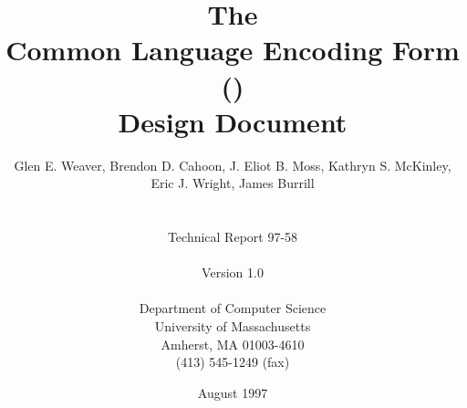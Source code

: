\begin{singlespace}
\title{\bfseries {\Large The} \\
{\Huge Common Language Encoding Form} \\
{\Huge (\clef)}\\
{\Huge Design Document}}

\author{Glen E. Weaver, Brendon D. Cahoon, J. Eliot B. Moss, Kathryn
S. McKinley, \\ Eric J. Wright, James Burrill\\
  {\ }\\ 
  {\ }\\ 
  {\large Technical Report 97-58 }\\ 
  {\ }\\ 
  {\Large Version 1.0} \\
  {\ }\\ 
  Department of Computer Science\\
  University of Massachusetts\\ Amherst, MA 01003-4610\\ (413)
  545-1249 (fax) }

\date{August 1997}

\end{singlespace}
\maketitle
